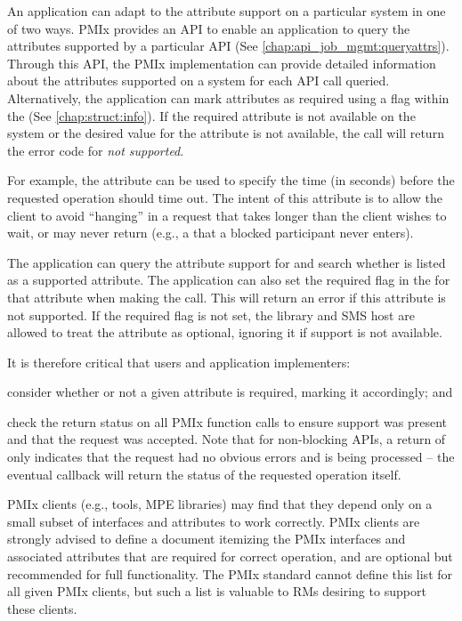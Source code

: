 An application can adapt to the attribute support on a particular system in one of two ways.  
\ac{PMIx} provides an \ac{API} to enable an application to query the attributes 
supported by a particular \ac{API} (See \ref{chap:api_job_mgmt:queryattrs}).  
Through this \ac{API}, the \ac{PMIx} implementation can provide detailed information 
about the attributes supported on a system for each \ac{API} call queried.
Alternatively, the application can mark attributes as 
required using a flag within the  (See \ref{chap:struct:info}). 
If the required attribute is 
not available on the system or the desired value for the attribute is not available, the call will 
return the error code for \textit{not supported}.

For example, the  attribute can be used to specify the time (in seconds) before the requested operation should time out. The intent of this attribute is to allow the client to avoid ``hanging'' in a request that takes longer than the client wishes to wait, or may never return (e.g., a  that a blocked participant never enters).

The application can query the attribute support for  
and search whether  is listed as a supported attribute.  The application can also   
set the required flag in the  for that attribute when making the  
call. This will return an error if this attribute is not supported. If the required flag is not set, 
the library and \ac{SMS} host are allowed to treat the attribute as optional, ignoring it if support 
is not available.

It is therefore critical that users and application implementers:

\begin{compactalphaenum}
\item consider whether or not a given attribute is required, marking it accordingly; and

\item check the return status on all \ac{PMIx} function calls to ensure support was present and that the request was accepted. Note that for non-blocking \acp{API}, a return of  only indicates that the request had no obvious errors and is being processed – the eventual callback will return the status of the requested operation itself.
\end{compactalphaenum}

\ac{PMIx} clients (e.g., tools, \ac{MPE} libraries) may find that they depend only on a small subset of interfaces and attributes to work correctly.
\ac{PMIx} clients are strongly advised to define a document itemizing the \ac{PMIx} interfaces and associated attributes that are required for correct operation, and are optional but recommended for full functionality.
The \ac{PMIx} standard cannot define this list for all given \ac{PMIx} clients, but such a list is valuable to \acp{RM} desiring to support these clients.

